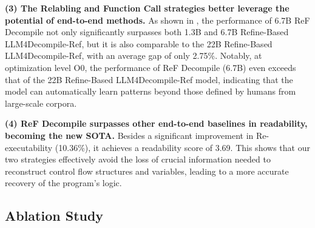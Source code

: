 \textbf{(3) The Relabling and Function Call strategies better leverage the potential of end-to-end methods.} As shown in , the performance of 6.7B ReF Decompile not only significantly surpasses both 1.3B and 6.7B Refine-Based LLM4Decompile-Ref, but it is also comparable to the 22B Refine-Based LLM4Decompile-Ref, with an average gap of only 2.75\%. Notably, at optimization level O0, the performance of ReF Decompile (6.7B) even exceeds that of the 22B Refine-Based LLM4Decompile-Ref model, indicating that the model can automatically learn patterns beyond those defined by humans from large-scale corpora.

\textbf{(4) ReF Decompile surpasses other end-to-end baselines in readability, becoming the new SOTA.} Besides a significant improvement in Re-executability (10.36\%), it achieves a readability score of 3.69. This shows that our two strategies effectively avoid the loss of crucial information needed to reconstruct control flow structures and variables, leading to a more accurate recovery of the program's logic.


% 


\subsection{Ablation Study}

